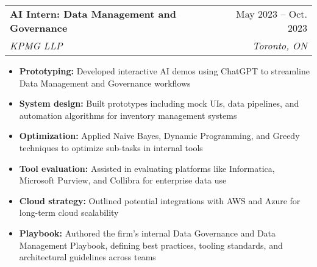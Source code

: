 \documentclass[letterpaper,11pt]{article}
\makeatletter
\newcommand{\resumeItem}[1]{\item\small{#1 \vspace{-2pt}}}
\newcommand{\resumeSubheading}[4]{
  \vspace{-2pt}\item
    \begin{tabular*}{0.97\textwidth}[t]{l@{\extracolsep{\fill}}r}
      \textbf{#1} & #2 \\
      \textit{\small#3} & \textit{\small #4} \\
    \end{tabular*}\vspace{-7pt}
}
\newcommand{\resumeItemListStart}{\begin{itemize}}
\newcommand{\resumeItemListEnd}{\end{itemize}\vspace{-5pt}}
\makeatother
\begin{document}
\resumeSubheading
{AI Intern: Data Management and Governance}{May 2023 -- Oct. 2023}
{KPMG LLP}{Toronto, ON}
\resumeItemListStart
  \resumeItem{\textbf{Prototyping:} Developed interactive AI demos using ChatGPT to streamline Data Management and Governance workflows}
  \resumeItem{\textbf{System design:} Built prototypes including mock UIs, data pipelines, and automation algorithms for inventory management systems}
  \resumeItem{\textbf{Optimization:} Applied Naive Bayes, Dynamic Programming, and Greedy techniques to optimize sub-tasks in internal tools}
  \resumeItem{\textbf{Tool evaluation:} Assisted in evaluating platforms like Informatica, Microsoft Purview, and Collibra for enterprise data use}
  \resumeItem{\textbf{Cloud strategy:} Outlined potential integrations with AWS and Azure for long-term cloud scalability}
  \resumeItem{\textbf{Playbook:} Authored the firm's internal Data Governance and Data Management Playbook, defining best practices, tooling standards, and architectural guidelines across teams}
\resumeItemListEnd
\end{document}

